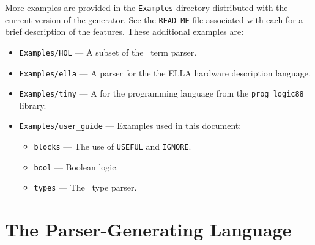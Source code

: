 More examples are provided in the \verb"Examples" directory distributed with 
the current version of the generator.  See the \verb"READ-ME" file associated
with each for a brief description of the features.  These additional examples
are:
\begin{itemize}
\item \verb"Examples/HOL" --- A subset of the \HOL\ term parser.
\item \verb"Examples/ella" --- A parser for the the {\small ELLA} hardware
description language.
\item \verb"Examples/tiny" --- A for the programming language
from the \verb"prog_logic88" library.
\item \verb"Examples/user_guide" --- Examples used in this document:
\begin{itemize}
\item \verb"blocks" --- The use of 
\verb"USEFUL" and 
\verb"IGNORE".
\item \verb"bool" --- Boolean logic.
\item \verb"types" --- The \HOL\ type parser.
\end{itemize}
\end{itemize}

\newpage
\section{The Parser-Generating Language}\label{BNFsec}

